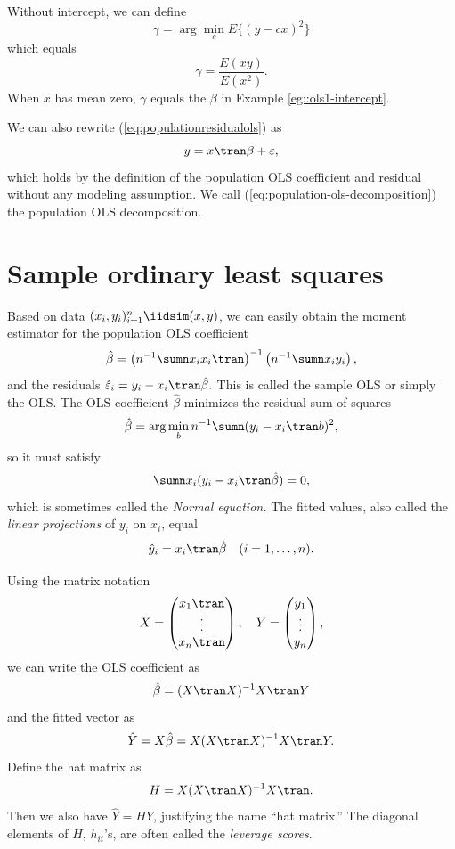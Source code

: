  
 \begin{example}
Without intercept, we can define 
$$
\gamma = \arg\min_{c} E \{  (y  - c x)^2 \}
$$
which equals
$$
\gamma = \frac{  E(xy) }{E(x^2)}.
$$
When $x$ has mean zero, $ \gamma$ equals the $\beta $ in Example \ref{eg::ols1-intercept}. 
\end{example}






We can also rewrite (\ref{eq:populationresidualols}) as
\begin{equation}
y=x \tran \beta+\varepsilon,\label{eq:population-ols-decomposition}
\end{equation}
which holds by the definition of the population OLS coefficient and residual without any modeling
assumption. We call (\ref{eq:population-ols-decomposition}) the population
OLS decomposition. 


 \section{Sample ordinary least squares}\label{sec::sampleOLS}

Based on data $(x_{i},y_{i})_{i=1}^{n} \iidsim (x,y)$, we can easily
obtain the moment estimator for the population OLS coefficient
\[
\hat{\beta}=\left(n^{-1}\sumn x_{i}x_{i} \tran \right)^{-1}\left(n^{-1}\sumn x_{i}y_{i}\right),
\]
and the residuals $ \hat{\varepsilon}_i = y_i - x_i \tran  \hat{\beta} . $ 
This is called the sample OLS or simply the OLS. The OLS coefficient 
$\hat{\beta}$ minimizes the residual sum of squares
\[
\hat \beta=\arg\min_{b } n^{-1} \sumn  (y_i-x_i \tran b)^{2} ,
\]
so it must satisfy 
$$
\sumn x_i (y_i-x_i \tran \hat{\beta}) = 0,
$$
which is sometimes called the {\it Normal equation.}
 The fitted values, also called the {\it linear projections} of $y_i$ on $x_i$, equal
 $$
 \hat{y}_i = x_i\tran \hat\beta \quad (i=1,\ldots, n).
 $$
 
 
 Using the matrix notation
 $$
 X = \begin{pmatrix}
 x_1\tran \\
 \vdots \\
 x_n\tran 
 \end{pmatrix},\quad
 Y = \begin{pmatrix}
 y_1 \\
 \vdots \\
 y_n
 \end{pmatrix} ,
 $$
 we can write the OLS coefficient as
$$
\hat{\beta} = (X \tran X)^{-1} X\tran Y
$$ 
and the fitted vector as
 $$
 \hat{Y} = X\hat{\beta} =  X (X \tran X)^{-1} X\tran Y.
 $$
Define the hat matrix as
$$
H =  X (X \tran X)^{-1} X\tran.
$$
Then we also have $ \hat{Y}  = HY$, justifying the name ``hat matrix.'' The diagonal elements of $H $, $h_{ii}$'s, are often called the {\it  leverage scores}.


